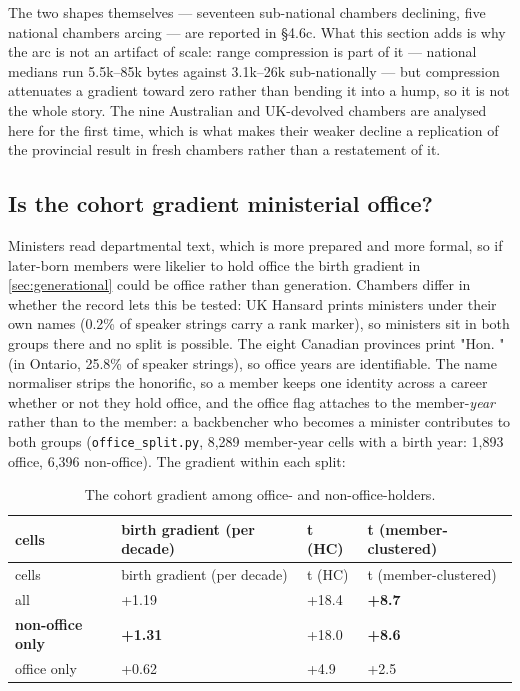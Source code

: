 The two shapes themselves --- seventeen sub-national chambers declining, five
national chambers arcing --- are reported in §4.6c. What this section adds is
why the arc is not an artifact of scale: range compression is part of it ---
national medians run 5.5k--85k bytes against 3.1k--26k sub-nationally --- but
compression attenuates a gradient toward zero rather than bending it into a
hump, so it is not the whole story. The nine Australian and UK-devolved
chambers are analysed here for the first time, which is what makes their
weaker decline a replication of the provincial result in fresh chambers
rather than a restatement of it.

\subsection{Is the cohort gradient ministerial office?}\label{sec:cohort-ministerial}

Ministers read departmental text, which is more prepared and more formal, so if
later-born members were likelier to hold office the birth gradient in \cref{sec:generational}
could be office rather than generation. Chambers differ in whether the record
lets this be tested: UK Hansard prints ministers under their own names (0.2\% of
speaker strings carry a rank marker), so ministers sit in both groups there and
no split is possible. The eight Canadian provinces print "Hon. " (in
Ontario, 25.8\% of speaker strings), so office years are identifiable. The name normaliser strips the honorific, so a
member keeps one identity across a career whether or not they hold office, and
the office flag attaches to the member-\emph{year} rather than to the member: a
backbencher who becomes a minister contributes to both groups
(\texttt{office\_split.py}, 8,289 member-year cells with a birth year: 1,893 office,
6,396 non-office).
The gradient within each split:

\begingroup\small
\begin{longtable}[]{@{}llll@{}}
\caption{The cohort gradient among office- and non-office-holders.}\label{tab:cohort-office}\\
\toprule\noalign{}
cells & birth gradient (per decade) & t (HC) & t (member-clustered) \\
\midrule\noalign{}
\endfirsthead
\toprule\noalign{}
cells & birth gradient (per decade) & t (HC) & t (member-clustered) \\
\midrule\noalign{}
\endhead
\bottomrule\noalign{}
\endlastfoot
all & +1.19 & +18.4 & \textbf{+8.7} \\
\textbf{non-office only} & \textbf{+1.31} & +18.0 & \textbf{+8.6} \\
office only & +0.62 & +4.9 & +2.5 \\
\end{longtable}
\endgroup

